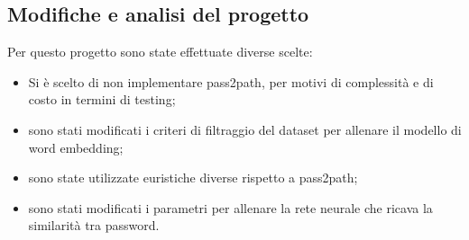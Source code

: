 \subsection{Modifiche e analisi del progetto}

Per questo progetto sono state effettuate diverse scelte:

\begin{itemize}
    \item Si è scelto di non implementare pass2path, per motivi di complessità e di costo in termini di testing;
    \item sono stati modificati i criteri di filtraggio del dataset per allenare il modello di word embedding;
    \item sono state utilizzate euristiche diverse rispetto a pass2path;
    \item sono stati modificati i parametri per allenare la rete neurale che ricava la similarità tra password.
\end{itemize}

